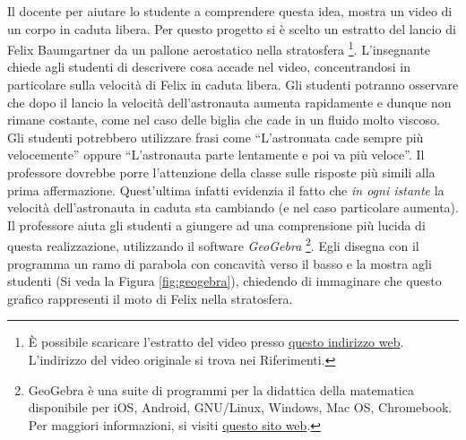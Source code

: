 \documentclass{report} \usepackage[T1]{fontenc} \usepackage[italian]{babel}
\begin{document}
Il docente per aiutare lo studente a comprendere questa idea,
mostra un video di un corpo in caduta libera. Per questo progetto
si è scelto un estratto del lancio di Felix Baumgartner da un
pallone aerostatico nella stratosfera
\footnote{
          \`E possibile scaricare l'estratto del video presso
          \href{https://github.com/savaroskij/PED1/blob/master/progetto_finale/media/video/felix_baumgartner.mp4?raw=true}{questo indirizzo web}.
          L'indirizzo del video originale si trova nei Riferimenti\cite{felix}.
         }.
L'insegnante chiede agli studenti di descrivere cosa accade nel
video, concentrandosi in particolare sulla velocità di Felix in caduta
libera. Gli studenti potranno osservare che dopo il lancio la velocità
dell'astronauta aumenta rapidamente e dunque non rimane costante, come nel
caso delle biglia che cade in un fluido molto viscoso.
Gli studenti potrebbero utilizzare frasi come ``L'astronuata cade
sempre più velocemente'' oppure ``L'astronauta parte
lentamente e poi va più veloce''.
Il professore dovrebbe porre l'attenzione della classe sulle
risposte più simili alla prima affermazione. Quest'ultima
infatti evidenzia il fatto che \emph{in ogni istante} la velocità
dell'astronauta in caduta sta cambiando (e nel caso particolare aumenta).
Il professore aiuta gli studenti a giungere ad una comprensione
più lucida di questa realizzazione, utilizzando il software
\emph{GeoGebra}
\footnote{
          GeoGebra è una suite di programmi per la didattica della matematica
          disponibile per iOS, Android, GNU/Linux, Windows, Mac OS, Chromebook.
          Per maggiori informazioni, si visiti
          \href{https://www.geogebra.org/}{questo sito web}.
         }.
Egli disegna con il programma un ramo di parabola con concavità
verso il basso e la mostra agli studenti (Si veda la Figura
\ref{fig:geogebra}), chiedendo di immaginare che questo grafico
rappresenti il moto di Felix nella stratosfera.
\end{document}
